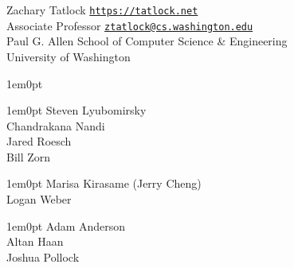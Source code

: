 \documentclass[11pt,letterpaper]{article}
\makeatletter
\newcommand{\cvWebsite}[0]{https://tatlock.net}
\newcommand{\cvEmail}[0]{ztatlock@cs.washington.edu}
\newcommand{\cvSection}[1]{\vspace{1em}{\Large #1}}
\newcommand{\cvSectionIndent}[0]{1em}
\newcommand{\cvSubSection}[1]{\vspace{0.1em}{\large #1}}
\newcommand{\cvSubSectionIndent}[0]{1em}
\makeatother
\begin{document}
{\LARGE Zachary Tatlock} \hfill
  \href{\cvWebsite}{\texttt{\cvWebsite}} \\[0.25em]
Associate Professor \hfill
  \href{mailto:\cvEmail}{\texttt{\cvEmail}} \\
Paul G. Allen School of Computer Science \& Engineering \\
University of Washington \\

\cvSection{Education}

\cvSection{Experience}

\cvSection{Current Students}
\begin{adjustwidth}{\cvSectionIndent}{0pt}

  \cvSubSection{PhD}
  \begin{adjustwidth}{\cvSubSectionIndent}{0pt}
    Steven Lyubomirsky \\

    Chandrakana Nandi \\

    Jared Roesch \\

    Bill Zorn \\
  \end{adjustwidth}

  \cvSubSection{Masters}
  \begin{adjustwidth}{\cvSubSectionIndent}{0pt}
    Marisa Kirasame (Jerry Cheng) \\

    Logan Weber \\
  \end{adjustwidth}

  \cvSubSection{Undergraduate}
  \begin{adjustwidth}{\cvSubSectionIndent}{0pt}
    Adam Anderson \\

    Altan Haan \\

    Joshua Pollock \\
  \end{adjustwidth}

\end{adjustwidth}
\end{document}
